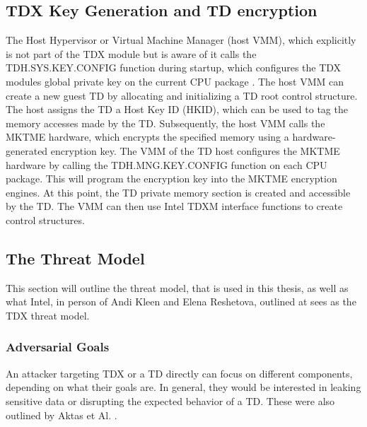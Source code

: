 \subsection{TDX Key Generation and TD encryption}
The Host Hypervisor or Virtual Machine Manager (host VMM), which explicitly is not part of the TDX module but is aware of it calls the TDH.SYS.KEY.CONFIG function during startup, which configures the TDX modules global private key on the current CPU package \cite{intel_corporation_intel-tdx-module-15-abi-spec-348551001pdf_2024}. The host VMM can create a new guest TD by allocating and initializing a TD root control structure. The host assigns the TD a Host Key ID (HKID), which can be used to tag the memory accesses made by the TD\cite{noauthor_tdx-module-10-public-specpdf_nodate}. Subsequently, the host VMM calls the MKTME hardware, which encrypts the specified memory using a hardware-generated encryption key\cite{noauthor_multi-key-total-memory-encryption-spec-14pdf_nodate}. The VMM of the TD host configures the MKTME hardware by calling the TDH.MNG.KEY.CONFIG function on each CPU package. This will program the encryption key into the MKTME encryption engines\cite{noauthor_tdx-module-10-public-specpdf_nodate}. At this point, the TD private memory section is created and accessible by the TD. The VMM can then use Intel TDXM interface functions to create control structures. 

\subsection{The Threat Model}

\label{Threat_Model}

This section will outline the threat model, that is used in this thesis, as well as what Intel, in person of Andi Kleen and Elena Reshetova, outlined at \cite{elena_reshetova_intel_2023} sees as the TDX threat model.

\subsubsection{Adversarial Goals}

An attacker targeting TDX or a TD directly can focus on different components, depending on what their goals are. In general, they would be interested in leaking sensitive data or disrupting the expected behavior of a TD. These were also outlined by Aktas et Al. \cite{aktas_intel_nodate}.


